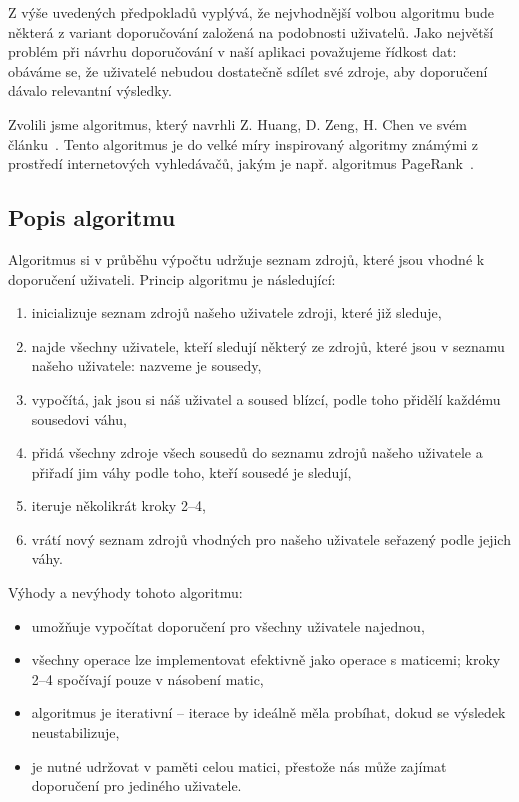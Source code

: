 Z výše uvedených předpokladů vyplývá, že nejvhodnější volbou algoritmu bude některá z variant doporučování založená na podobnosti uživatelů.
Jako největší problém při návrhu doporučování v naší aplikaci považujeme řídkost dat: obáváme se, že uživatelé nebudou dostatečně sdílet své zdroje, aby doporučení dávalo relevantní výsledky.

Zvolili jsme algoritmus, který navrhli Z. Huang, D. Zeng, H. Chen ve svém článku~\cite{huang2004link}.
Tento algoritmus je do velké míry inspirovaný algoritmy známými z prostředí internetových vyhledávačů, jakým je např. algoritmus PageRank~\cite{page1999pagerank}.

\subsection{Popis algoritmu}

Algoritmus si v průběhu výpočtu udržuje seznam zdrojů, které jsou vhodné k doporučení uživateli.
Princip algoritmu je následující:
\begin{enumerate}
    \item inicializuje seznam zdrojů našeho uživatele zdroji, které již sleduje,
    \item najde všechny uživatele, kteří sledují některý ze zdrojů, které jsou v seznamu našeho uživatele: nazveme je sousedy,
    \item vypočítá, jak jsou si náš uživatel a soused blízcí, podle toho přidělí každému sousedovi váhu,
    \item přidá všechny zdroje všech sousedů do seznamu zdrojů našeho uživatele a přiřadí jim váhy podle toho, kteří sousedé je sledují,
    \item iteruje několikrát kroky 2--4,
    \item vrátí nový seznam zdrojů vhodných pro našeho uživatele seřazený podle jejich váhy.
\end{enumerate}

Výhody a nevýhody tohoto algoritmu:
\def\proitem{\item[$\boldsymbol{+}$]}
\def\conitem{\item[$\boldsymbol{-}$]}
\begin{itemize}
    \proitem umožňuje vypočítat doporučení pro všechny uživatele najednou,
    \proitem všechny operace lze implementovat efektivně jako operace s maticemi; kroky 2--4 spočívají pouze v násobení matic,
	\conitem algoritmus je iterativní -- iterace by ideálně měla probíhat, dokud se výsledek neustabilizuje,
	\conitem je nutné udržovat v paměti celou matici, přestože nás může zajímat doporučení pro jediného uživatele.
\end{itemize}

